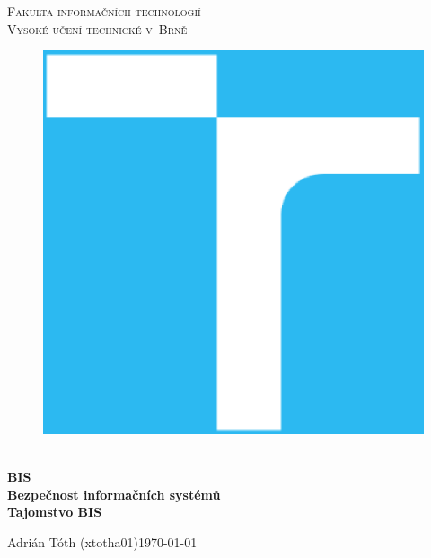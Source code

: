 \documentclass[11pt,a4paper]{article}
\begin{document}
\begin{titlepage}
    \begin{center}
        \Huge
        \textsc{
            Fakulta informačních technologií\\
            Vysoké učení technické v~Brně
        }
        \vspace{80px}
        \begin{figure}[!h]
            \centering
            \includegraphics[scale=0.3]{vutbr-fit-logo.eps}
        \end{figure}
        \\[15mm]
        \Huge{
            \textbf{
                BIS
            }
        }
        \\[1.5mm]
        \huge{
            \textbf{
                Bezpečnost informačních systémů
            }
        }
        \\[2.5em]
        \LARGE{
            \textbf{
                Tajomstvo BIS
            }
        }
        \vfill
    \end{center}
        \Large{
            Adrián Tóth (xtotha01)\hfill \today
        }
\end{titlepage}

\setlength{\parskip}{0pt}
\hypersetup{hidelinks}\tableofcontents
\setlength{\parskip}{0pt}
\end{document}
